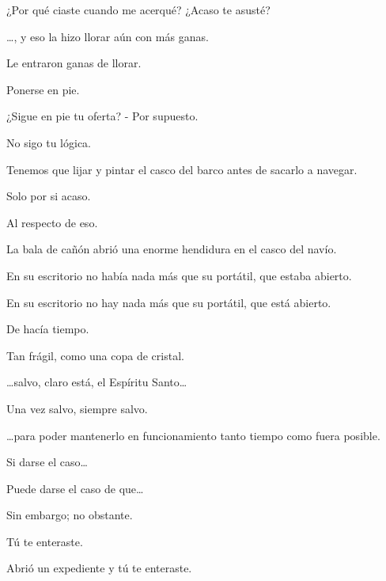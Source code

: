 \sk
¿Por qué ciaste cuando me acerqué? ¿Acaso te asusté? 

\sk
\ldots{}, y eso la hizo llorar aún con más ganas. 

\sk
Le entraron ganas de llorar. 

\sk
Ponerse en pie. 

\sk
¿Sigue en pie tu oferta? - Por supuesto. 

\sk
No sigo tu lógica. 

\sk
Tenemos que lijar y pintar el casco del barco antes de sacarlo a navegar. 

\sk
Solo por si acaso. 

\sk
Al respecto de eso. 

\sk
La bala de cañón abrió una enorme hendidura en el casco del navío. 

\sk
En su escritorio no había nada más que su portátil, que estaba abierto. 

\sk
En su escritorio no hay nada más que su portátil, que está abierto.\nb{}

\sk
De hacía tiempo. 

\sk
Tan frágil, como una copa de cristal.\nb{}

\sk
\ldots{}salvo, claro está, el Espíritu Santo\ldots{}\nb{}

\sk
Una vez salvo, siempre salvo. 

\sk
\ldots{}para poder mantenerlo en funcionamiento tanto tiempo como fuera posible. 

\sk
Si darse el caso\ldots{} 

\sk
Puede darse el caso de que\ldots{} 

\sk
Sin embargo; no obstante. 

\sk
Tú te enteraste. 

\sk
Abrió un expediente y tú te enteraste. 

